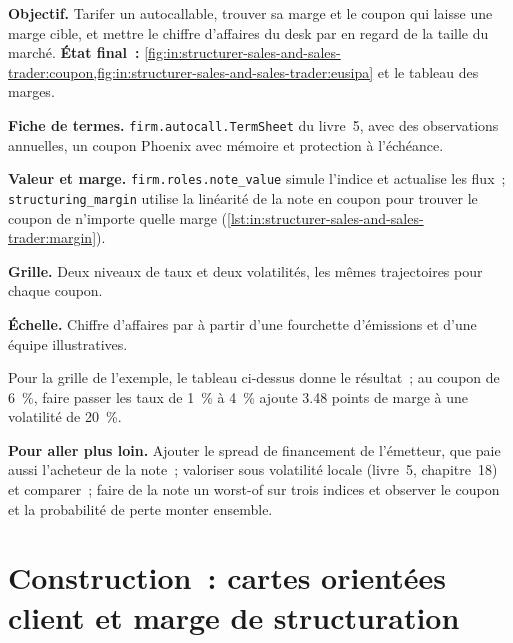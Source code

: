 \begin{tutorial}
\textbf{Objectif.} Tarifer un autocallable, trouver sa marge et le coupon qui laisse une marge cible, et mettre le chiffre
d'affaires du desk par  en regard de la taille du marché.
\textbf{État final~:} \cref{fig:in:structurer-sales-and-sales-trader:coupon,fig:in:structurer-sales-and-sales-trader:eusipa}
et le tableau des marges.
\begin{tutsteps}
\item \textbf{Fiche de termes.} \texttt{firm.autocall.TermSheet} du livre~5, avec des observations annuelles, un coupon Phoenix avec
mémoire et protection à l'échéance.
\item \textbf{Valeur et marge.} \texttt{firm.roles.note\_value} simule l'indice et actualise les flux~;
\texttt{structuring\_margin} utilise la linéarité de la note en coupon pour trouver le coupon de n'importe quelle marge
(\cref{lst:in:structurer-sales-and-sales-trader:margin}).
\label{lst:in:structurer-sales-and-sales-trader:margin}
\item \textbf{Grille.} Deux niveaux de taux et deux volatilités, les mêmes trajectoires pour chaque coupon.
\item \textbf{Échelle.} Chiffre d'affaires par  à partir d'une fourchette d'émissions et d'une équipe illustratives.
\end{tutsteps}
\end{tutorial}

Pour la grille de l'exemple, le tableau ci-dessus donne le résultat~; au coupon de 6~\%, faire passer les taux de 1~\% à 4~\% ajoute 3.48 points de
marge à une volatilité de 20~\%.

\textbf{Pour aller plus loin.} Ajouter le spread de financement de l'émetteur, que paie aussi l'acheteur de la note~; valoriser
sous volatilité locale (livre~5, chapitre~18) et comparer~; faire de la note un worst-of sur trois indices et observer le coupon
et la probabilité de perte monter ensemble.

\section{Construction~: cartes orientées client et marge de structuration}\label{bld:in:structurer-sales-and-sales-trader:roles}

